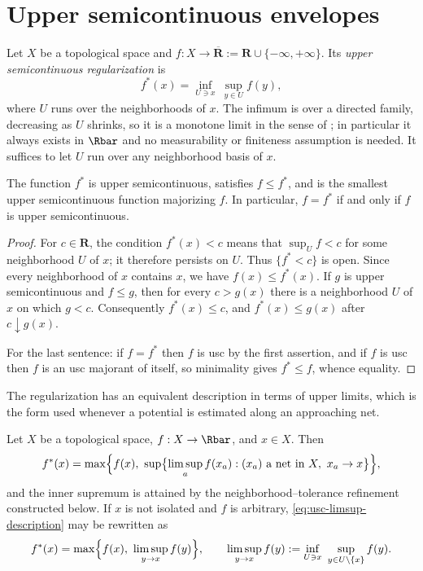 \section{Upper semicontinuous envelopes}
\label{sec:usc-envelopes}

Let $X$ be a topological space and
$f:X\to\overline{\mathbf R}:=\mathbf R\cup\{-\infty,+\infty\}$.  Its
\emph{upper semicontinuous regularization} is
\begin{equation}
\label{eq:usc-regularization}
 f^*(x)=\inf_{U\ni x}\ \sup_{y\in U}f(y),
\end{equation}
where $U$ runs over the neighborhoods of $x$.  The infimum is over a directed
family, decreasing as $U$ shrinks, so it is a monotone limit in the sense of
; in particular it always exists in $\Rbar$
and no measurability or finiteness assumption is needed.  It suffices to let
$U$ run over any neighborhood basis of $x$.

\begin{proposition}
\label{prop:usc-majorant}
The function $f^*$ is upper semicontinuous, satisfies $f\leq f^*$, and is the
smallest upper semicontinuous function majorizing $f$.  In particular,
$f=f^*$ if and only if $f$ is upper semicontinuous.
\end{proposition}

\begin{proof}
For $c\in\mathbf R$, the condition $f^*(x)<c$ means that
$\sup_U f<c$ for some neighborhood $U$ of $x$; it therefore persists on $U$.
Thus $\{f^*<c\}$ is open.  Since every neighborhood of $x$ contains $x$, we
have $f(x)\leq f^*(x)$.  If $g$ is upper semicontinuous and $f\leq g$, then
for every $c>g(x)$ there is a neighborhood $U$ of $x$ on which $g<c$.
Consequently $f^*(x)\leq c$, and $f^*(x)\leq g(x)$ after $c\downarrow g(x)$.

For the last sentence: if $f=f^*$ then $f$ is usc by the first assertion,
and if $f$ is usc then $f$ is an usc majorant of itself, so minimality gives
$f^*\leq f$, whence equality.
\end{proof}

The regularization has an equivalent description in terms of upper limits,
which is the form used whenever a potential is estimated along an approaching
net.

\begin{proposition}
\label{prop:usc-limsup-description}
Let $X$ be a topological space, $f:X\to\Rbar$, and $x\in X$.  Then
\begin{equation}
\label{eq:usc-limsup-description}
 f^*(x)=\max\Bigl\{f(x),\ \sup\bigl\{\limsup_a f(x_a):
 (x_a)\text{ a net in }X,\ x_a\to x\bigr\}\Bigr\},
\end{equation}
and the inner supremum is attained by the neighborhood--tolerance refinement
constructed below.  If $x$ is not isolated and $f$ is arbitrary,
\eqref{eq:usc-limsup-description} may be rewritten as
\[
 f^*(x)=\max\Bigl\{f(x),\ \limsup_{y\to x}f(y)\Bigr\},
 \qquad
 \limsup_{y\to x}f(y):=\inf_{U\ni x}\ \sup_{y\in U\setminus\{x\}}f(y).
\]
\end{proposition}

